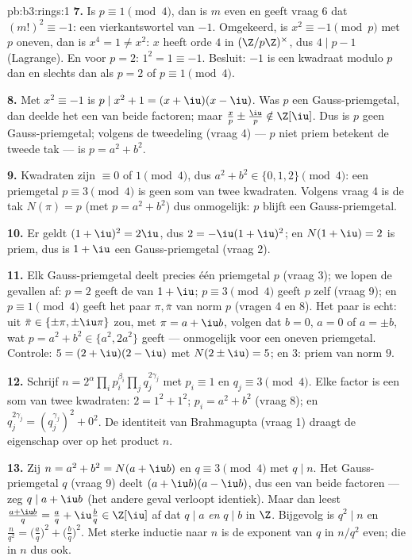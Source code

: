 \begin{solution}{pb:b3:rings:1}
\textbf{7.} Is $p \equiv 1 \pmod 4$, dan is $m$ even en geeft vraag
6 dat $(m!)^2 \equiv -1$: een vierkantswortel van $-1$. Omgekeerd,
is $x^2 \equiv -1 \pmod p$ met $p$ oneven, dan is $x^4 = 1 \neq
x^2$: $x$ heeft orde $4$ in $(\Z/p\Z)^\times$, dus $4 \mid p - 1$
(Lagrange). En voor $p = 2$: $1^2 = 1 \equiv -1$. Besluit: $-1$ is
een kwadraat modulo $p$ dan en slechts dan als $p = 2$ of $p \equiv
1 \pmod 4$.

\textbf{8.} Met $x^2 \equiv -1$ is $p \mid x^2 + 1 = (x + \iu)(x -
\iu)$. Was $p$ een Gauss-priemgetal, dan deelde het een van beide
factoren; maar $\frac xp \pm \frac \iu p \notin \Z[\iu]$. Dus is
$p$ geen Gauss-priemgetal; volgens de tweedeling (vraag 4) --- $p$
niet priem betekent de tweede tak --- is $p = a^2 + b^2$.

\textbf{9.} Kwadraten zijn $\equiv 0$ of $1 \pmod 4$, dus $a^2 +
b^2 \in \{0, 1, 2\} \pmod 4$: een priemgetal $p \equiv 3 \pmod 4$
is geen som van twee kwadraten. Volgens vraag 4 is de tak $N(\pi) =
p$ (met $p = a^2+b^2$) dus onmogelijk: $p$ blijft een
Gauss-priemgetal.

\textbf{10.} Er geldt $(1 + \iu)^2 = 2\iu$, dus $2 = -\iu(1 +
\iu)^2$; en $N(1 + \iu) = 2$ is priem, dus is $1 + \iu$ een
Gauss-priemgetal (vraag 2).

\textbf{11.} Elk Gauss-priemgetal deelt precies één priemgetal $p$
(vraag 3); we lopen de gevallen af: $p = 2$ geeft de 
van $1 + \iu$; $p \equiv 3 \pmod 4$ geeft $p$ zelf (vraag 9); en $p
\equiv 1 \pmod 4$ geeft het paar $\pi, \bar\pi$ van norm $p$
(vragen 4 en 8). Het paar is echt: uit $\bar\pi \in \{\pm\pi,
\pm\iu\pi\}$ zou, met $\pi = a + \iu b$, volgen dat $b = 0$, $a =
0$ of $a = \pm b$, wat $p = a^2 + b^2 \in \{a^2, 2a^2\}$ geeft ---
onmogelijk voor een oneven priemgetal. Controle: $5 = (2 + \iu)(2 -
\iu)$ met $N(2\pm\iu) = 5$; en $3$: priem van norm $9$.

\textbf{12.} Schrijf $n = 2^{\alpha}\prod_i p_i^{\beta_i} \prod_j
q_j^{2\gamma_j}$ met $p_i \equiv 1$ en $q_j \equiv 3 \pmod 4$. Elke
factor is een som van twee kwadraten: $2 = 1^2 + 1^2$; $p_i = a^2 +
b^2$ (vraag 8); en $q_j^{2\gamma_j} = (q_j^{\gamma_j})^2 + 0^2$. De
identiteit van Brahmagupta (vraag 1) draagt de eigenschap over op
het product $n$.

\textbf{13.} Zij $n = a^2 + b^2 = N(a + \iu b)$ en $q \equiv 3
\pmod 4$ met $q \mid n$. Het Gauss-priemgetal $q$ (vraag 9) deelt
$(a + \iu b)(a - \iu b)$, dus een van beide factoren --- zeg $q
\mid a + \iu b$ (het andere geval verloopt identiek). Maar dan
leest $\frac{a + \iu b}{q} = \frac aq + \iu \frac bq \in \Z[\iu]$
af dat $q \mid a$ \emph{en} $q \mid b$ in $\Z$. Bijgevolg is $q^2
\mid n$ en $\frac n{q^2} = \bigl(\frac aq\bigr)^2 + \bigl(\frac
bq\bigr)^2$. Met sterke inductie naar $n$ is de exponent van $q$ in
$n/q^2$ even; die in $n$ dus ook.


\end{solution}
